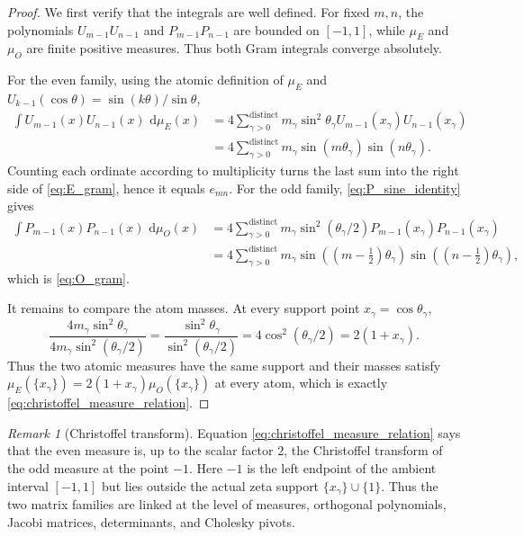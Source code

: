 \documentclass[11pt]{amsart}
\numberwithin{equation}{section}
\theoremstyle{plain}
\theoremstyle{definition}
\theoremstyle{remark}
\newtheorem{remark}[theorem]{Remark}
\newcommand{\dd}{\,\mathrm d}
\begin{document}
\begin{proof}
We first verify that the integrals are well defined.  For fixed $m,n$, the polynomials $U_{m-1}U_{n-1}$ and $P_{m-1}P_{n-1}$ are bounded on $[-1,1]$, while $\mu_E$ and $\mu_O$ are finite positive measures.  Thus both Gram integrals converge absolutely.

For the even family, using the atomic definition of $\mu_E$ and $U_{k-1}(\cos\theta)=\sin(k\theta)/\sin\theta$,
\begin{align}
\int U_{m-1}(x)U_{n-1}(x)\,\dd\mu_E(x)
&=4\sum_{\gamma>0}^{\mathrm{distinct}}m_\gamma\sin^2\theta_\gamma
U_{m-1}(x_\gamma)U_{n-1}(x_\gamma)\\
&=4\sum_{\gamma>0}^{\mathrm{distinct}}m_\gamma
\sin(m\theta_\gamma)\sin(n\theta_\gamma).
\end{align}
Counting each ordinate according to multiplicity turns the last sum into the right side of \eqref{eq:E_gram}, hence it equals $e_{mn}$.  For the odd family, \eqref{eq:P_sine_identity} gives
\begin{align}
\int P_{m-1}(x)P_{n-1}(x)\,\dd\mu_O(x)
&=4\sum_{\gamma>0}^{\mathrm{distinct}}m_\gamma\sin^2(\theta_\gamma/2)
P_{m-1}(x_\gamma)P_{n-1}(x_\gamma)\\
&=4\sum_{\gamma>0}^{\mathrm{distinct}}m_\gamma
\sin((m-\tfrac12)\theta_\gamma)
\sin((n-\tfrac12)\theta_\gamma),
\end{align}
which is \eqref{eq:O_gram}.

It remains to compare the atom masses.  At every support point $x_\gamma=\cos\theta_\gamma$,
\begin{equation}
\frac{4m_\gamma\sin^2\theta_\gamma}
{4m_\gamma\sin^2(\theta_\gamma/2)}
=\frac{\sin^2\theta_\gamma}{\sin^2(\theta_\gamma/2)}
=4\cos^2(\theta_\gamma/2)=2(1+x_\gamma).
\label{eq:weight_ratio}
\end{equation}
Thus the two atomic measures have the same support and their masses satisfy
$\mu_E(\{x_\gamma\})=2(1+x_\gamma)\mu_O(\{x_\gamma\})$ at every atom, which is exactly \eqref{eq:christoffel_measure_relation}.
\end{proof}

\begin{remark}[Christoffel transform]
\label{rem:christoffel_transform}
Equation \eqref{eq:christoffel_measure_relation} says that the even measure is, up to the scalar factor $2$, the Christoffel transform of the odd measure at the point $-1$. Here $-1$ is the left endpoint of the ambient interval $[-1,1]$ but lies outside the actual zeta support $\{x_\gamma\}\cup\{1\}$. Thus the two matrix families are linked at the level of measures, orthogonal polynomials, Jacobi matrices, determinants, and Cholesky pivots.
\end{remark}
\end{document}
